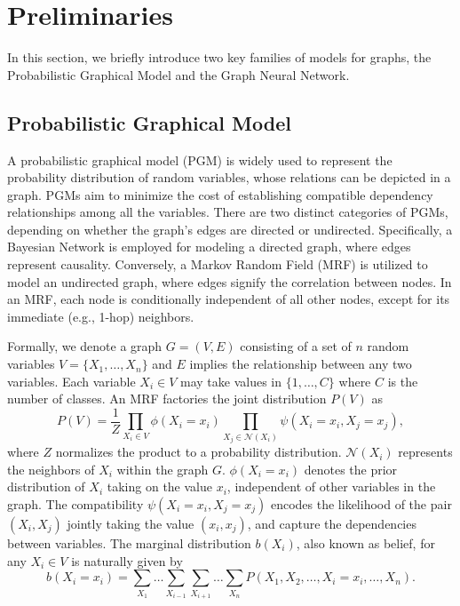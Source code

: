 \section{Preliminaries}
\label{sec:preliminaries}
In this section, we briefly introduce two key families of models for graphs, the Probabilistic Graphical Model and the Graph Neural Network.

\subsection{Probabilistic Graphical Model}
A probabilistic graphical model (PGM) \cite{bishop2006pattern,jordan2004graphical} is widely used to represent the probability distribution of random variables, whose relations can be depicted in a graph.
PGMs aim to minimize the cost of establishing compatible dependency relationships among all the variables. 
There are two distinct categories of PGMs, depending on whether the graph's edges are directed or undirected. 
Specifically, a Bayesian Network is employed for modeling a directed graph, where edges represent causality. 
Conversely, a Markov Random Field (MRF) is utilized to model an undirected graph, where edges signify the correlation between nodes. 
In an MRF, each node is conditionally independent of all other nodes, except for its immediate (e.g., 1-hop) neighbors.

Formally, 
we denote a graph $G=(V,E)$ consisting of a set of $n$ random variables $V=\{ X_1, \dots, X_n \}$ and $E$ implies the relationship between any two variables. 
Each variable $X_i \in V$ may take values in $\{1,\dots, C\}$ where $C$ is the number of classes.
An MRF factories the joint distribution $P(V)$ as 
\begin{equation}
\label{eq:pgm_joint}
    P(V)=\frac{1}{Z}\prod_{X_i\in V} \phi(X_i=x_i) \prod_{X_j\in \mathcal{N}(X_i)}\psi(X_i=x_i, X_j=x_j),
\end{equation}
where $Z$ normalizes the product to a probability distribution.
$\mathcal{N}(X_i)$ represents the neighbors of $X_i$ within the graph $G$.
$\phi(X_i=x_i)$ denotes the prior distribution of $X_i$ taking on the value $x_i$, independent of other variables in the graph.
The compatibility $\psi(X_i=x_i, X_j=x_j)$ encodes the likelihood of the pair
$(X_i, X_j)$ jointly taking the value $(x_i, x_j)$,
and capture the dependencies between variables.
The marginal distribution $b(X_i)$, also known as belief, for any $X_i \in V$ is naturally given by
\begin{equation}
\label{eq:pgm_margin}
    b(X_i=x_i) = \sum_{X_1} \dots \sum_{X_{i-1}} \sum_{X_{i+1}} \dots \sum_{X_n} P(X_1, X_2, \dots, X_i=x_i, \dots, X_n).
\end{equation}

